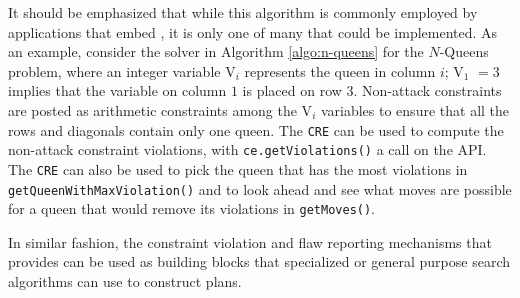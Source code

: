 It should be emphasized that while this algorithm is commonly employed
by applications that embed \eue, it is only one of many that could be
implemented. As an example, consider the solver in Algorithm
\ref{algo:n-queens} for the $N$-Queens problem, where an integer
variable V$_i$ represents the queen in column $i$; V$_1$ $= 3$ implies
that the variable on column $1$ is placed on row $3$.  Non-attack
constraints are posted as arithmetic constraints among the V$_i$
variables to ensure that all the rows and diagonals contain only one
queen. The \texttt{CRE} can be used to compute the non-attack
constraint violations, with \texttt{ce.getViolations()} a call on the
\eu API. The \texttt{CRE} can also be used to pick the queen that has
the most violations in \texttt{getQueenWithMaxViolation()} and to look
ahead and see what moves are possible for a queen that would remove
its violations in \texttt{getMoves()}.

In similar fashion, the constraint violation and flaw reporting
mechanisms that \eu provides can be used as building blocks that
specialized or general purpose search algorithms can use to construct
plans.

\begin{algorithm}
  \caption{$solveNQueens(ce, maxIter)$}
  \label{algo:n-queens}
\end{algorithm}




 